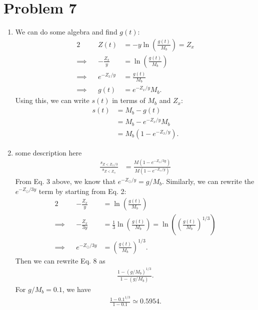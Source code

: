 \documentclass[11pt,letterpaper]{article}
\begin{document}
\section*{Problem 7}

\begin{enumerate}[label=(\roman*)]
    \item We can do some algebra and find $g(t)$:
        \begin{alignat}{2}
            &&Z(t) &= -y\ln{\left(\frac{g(t)}{M_b}\right)} = Z_x\\
            \implies&&-\frac{Z_x}{y} &= \ln{\left(\frac{g(t)}{M_b}\right)} \\
            \implies&&e^{-Z_x/y} &= \frac{g(t)}{M_b} \\
            \implies&&g(t) &= e^{-Z_x/y}M_b.
        \end{alignat}
    Using this, we can write $s(t)$ in terms of $M_b$ and $Z_x$:
    \begin{align}
        s(t) &= M_b - g(t) \\
        &= M_b - e^{-Z_x/y}M_b \\
        &= M_b(1-e^{-Z_x/y}).
    \end{align}
    
    \item some description here
    \begin{align}
        \frac{s_{Z<Z_\odot/3}}{s_{Z<Z_\odot}} &= \frac{M(1-e^{-Z_\odot/3y})}{M(1-e^{-Z_\odot/y})}
    \end{align}
    From Eq. 3 above, we know that $e^{-Z_\odot/y} = g/M_b$. Similarly, we can rewrite the $e^{-Z_\odot/3y}$ term by starting from Eq. 2:
    \begin{alignat}{2}
        &&-\frac{Z_x}{y} &= \ln{\left(\frac{g(t)}{M_b}\right)} \\
        \implies&&-\frac{Z_x}{3y} &= \frac{1}{3}\ln{\left(\frac{g(t)}{M_b}\right)} = \ln{\left(\left(\frac{g(t)}{M_b}\right)^{1/3}\right)} \\
        \implies&&e^{-Z_\odot/3y} &= \left(\frac{g(t)}{M_b}\right)^{1/3}.
    \end{alignat}
    Then we can rewrite Eq. 8 as 
    \begin{align}
        \frac{1-(g/M_b)^{1/3}}{1-(g/M_b)}.
    \end{align}
    For $g/M_b = 0.1$, we have 
    \begin{align}
        \frac{1-0.1^{1/3}}{1-0.1} \simeq 0.5954.
    \end{align}


\end{enumerate}
\end{document}
